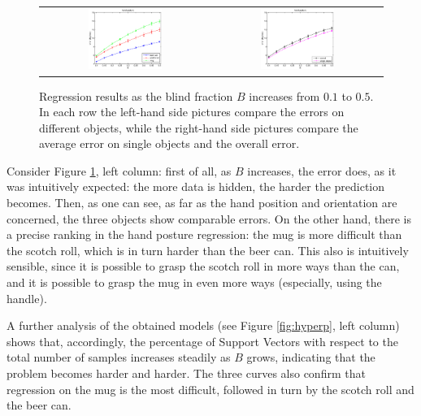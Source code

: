 \begin{figure}[htbp]
\begin{center}
\begin{tabular}{cc}
      \includegraphics[width=0.45\textwidth]{error_pst.eps} &
      \includegraphics[width=0.45\textwidth]{error_cmp_pst.eps} \\
    \end{tabular}
    \caption{Regression results as the blind fraction $B$ increases
    from $0.1$ to $0.5$. In each row the
    left-hand side pictures compare the errors on different objects,
    while the right-hand side pictures compare the average error on
    single objects and the overall error.}
    \label{fig:err_all}
  \end{center}
\end{figure}

Consider Figure \ref{fig:err_all}, left column: first of all, as $B$
increases, the error does, as it was intuitively expected: the more
data is hidden, the harder the prediction becomes. Then, as one can
see, as far as the hand position and orientation are concerned, the
three objects show comparable errors. On the other hand, there is a
precise ranking in the hand posture regression: the mug is more
difficult than the scotch roll, which is in turn harder than the beer
can. This also is intuitively sensible, since it is possible to grasp
the scotch roll in more ways than the can, and it is possible to grasp
the mug in even more ways (especially, using the handle).

A further analysis of the obtained models (see Figure
\ref{fig:hyperp}, left column) shows that, accordingly, the percentage
of Support Vectors with respect to the total number of samples
increases steadily as $B$ grows, indicating that the problem becomes
harder and harder. The three curves also confirm that regression on
the mug is the most difficult, followed in turn by the scotch roll and
the beer can.

